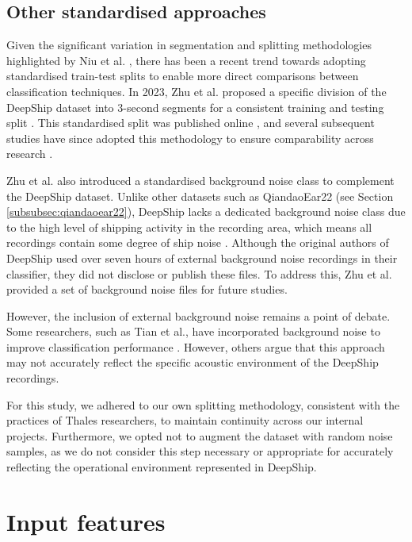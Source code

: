 \subsection{Other standardised approaches}

Given the significant variation in segmentation and splitting methodologies highlighted by Niu et al. \cite{niu_advances_2023}, there has been a recent trend towards adopting standardised train-test splits to enable more direct comparisons between classification techniques. In 2023, Zhu et al. proposed a specific division of the DeepShip dataset into 3-second segments for a consistent training and testing split \cite{zhu_underwater_2023}. This standardised split was published online \cite{zhupengsen_zhupengsenmethod-for-splitting--deepship-dataset_2024}, and several subsequent studies have since adopted this methodology to ensure comparability across research \cite{xu_self-supervised_2023, xu_self-supervised_2024, zhu_sfc-sup_2023, lin_underwater_2024}.

Zhu et al. also introduced a standardised background noise class to complement the DeepShip dataset. Unlike other datasets such as QiandaoEar22 (see Section \ref{subsubsec:qiandaoear22}), DeepShip lacks a dedicated background noise class due to the high level of shipping activity in the recording area, which means all recordings contain some degree of ship noise \cite{irfan_deepship_2021}. Although the original authors of DeepShip used over seven hours of external background noise recordings in their classifier, they did not disclose or publish these files. To address this, Zhu et al. provided a set of background noise files for future studies.

However, the inclusion of external background noise remains a point of debate. Some researchers, such as Tian et al., have incorporated background noise to improve classification performance \cite{tian_joint_2023}. However, others argue that this approach may not accurately reflect the specific acoustic environment of the DeepShip recordings.

For this study, we adhered to our own splitting methodology, consistent with the practices of Thales researchers, to maintain continuity across our internal projects. Furthermore, we opted not to augment the dataset with random noise samples, as we do not consider this step necessary or appropriate for accurately reflecting the operational environment represented in DeepShip.

\section{Input features}\label{sec:inputs}

